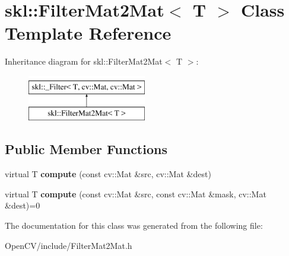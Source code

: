 \hypertarget{classskl_1_1_filter_mat2_mat}{}\section{skl\+:\+:Filter\+Mat2\+Mat$<$ T $>$ Class Template Reference}
\label{classskl_1_1_filter_mat2_mat}
Inheritance diagram for skl\+:\+:Filter\+Mat2\+Mat$<$ T $>$\+:\begin{figure}[H]
\begin{center}
\leavevmode
\includegraphics[height=2.000000cm]{classskl_1_1_filter_mat2_mat}
\end{center}
\end{figure}
\subsection*{Public Member Functions}
\begin{DoxyCompactItemize}
\item 
\hypertarget{classskl_1_1_filter_mat2_mat_ad906b4418761b1ba3a8ac446e53b4313}{}\label{classskl_1_1_filter_mat2_mat_ad906b4418761b1ba3a8ac446e53b4313} 
virtual T {\bfseries compute} (const cv\+::\+Mat \&src, cv\+::\+Mat \&dest)
\item 
\hypertarget{classskl_1_1_filter_mat2_mat_a5e86d618516207e937bf6f3c72fc3324}{}\label{classskl_1_1_filter_mat2_mat_a5e86d618516207e937bf6f3c72fc3324} 
virtual T {\bfseries compute} (const cv\+::\+Mat \&src, const cv\+::\+Mat \&mask, cv\+::\+Mat \&dest)=0
\end{DoxyCompactItemize}


The documentation for this class was generated from the following file\+:\begin{DoxyCompactItemize}
\item 
Open\+C\+V/include/Filter\+Mat2\+Mat.\+h\end{DoxyCompactItemize}
